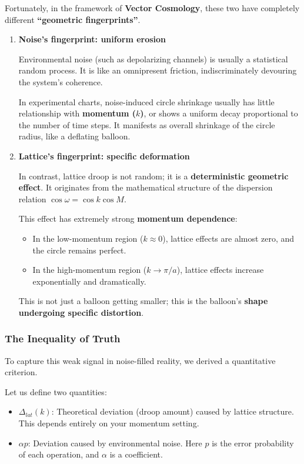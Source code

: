 Fortunately, in the framework of \textbf{Vector Cosmology}, these two have completely different \textbf{``geometric fingerprints''}.

\begin{enumerate}
\item \textbf{Noise's fingerprint: uniform erosion}

    Environmental noise (such as depolarizing channels) is usually a statistical random process. It is like an omnipresent friction, indiscriminately devouring the system's coherence.

    In experimental charts, noise-induced circle shrinkage usually has little relationship with \textbf{momentum ($k$)}, or shows a uniform decay proportional to the number of time steps. It manifests as overall shrinkage of the circle radius, like a deflating balloon.

\item \textbf{Lattice's fingerprint: specific deformation}

    In contrast, lattice droop is not random; it is a \textbf{deterministic geometric effect}. It originates from the mathematical structure of the dispersion relation $\cos \omega = \cos k \cos M$.

    This effect has extremely strong \textbf{momentum dependence}:

    \begin{itemize}
    \item In the low-momentum region ($k \approx 0$), lattice effects are almost zero, and the circle remains perfect.

    \item In the high-momentum region ($k \to \pi/a$), lattice effects increase exponentially and dramatically.
    \end{itemize}

    This is not just a balloon getting smaller; this is the balloon's \textbf{shape undergoing specific distortion}.
\end{enumerate}

\subsubsection{The Inequality of Truth}

To capture this weak signal in noise-filled reality, we derived a quantitative criterion.

Let us define two quantities:

\begin{itemize}
\item \textbf{$\Delta_{lat}(k)$}: Theoretical deviation (droop amount) caused by lattice structure. This depends entirely on your momentum setting.

\item \textbf{$\alpha p$}: Deviation caused by environmental noise. Here $p$ is the error probability of each operation, and $\alpha$ is a coefficient.
\end{itemize}

